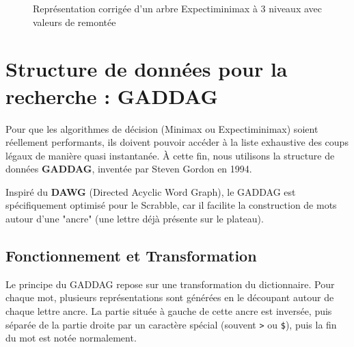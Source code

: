 \documentclass[a4paper]{article}
\begin{document}
\begin{figure}[H]
    \caption{Représentation corrigée d'un arbre Expectiminimax à 3 niveaux avec valeurs de remontée}
    \label{fig:tree_structure}
\end{figure}



\section{Structure de données pour la recherche : GADDAG}
\hangindent=0.8mm
Pour que les algorithmes de décision (Minimax ou Expectiminimax) soient réellement performants, ils doivent pouvoir accéder à la liste exhaustive des coups légaux de manière quasi instantanée. À cette fin, nous utilisons la structure de données \textbf{GADDAG}, inventée par Steven Gordon en 1994.

\hangindent=0.8mm
Inspiré du \textbf{DAWG} (Directed Acyclic Word Graph), le GADDAG est spécifiquement optimisé pour le Scrabble, car il facilite la construction de mots autour d'une "ancre" (une lettre déjà présente sur le plateau).

\subsection{Fonctionnement et Transformation}
\hangindent=0.8mm
Le principe du GADDAG repose sur une transformation du dictionnaire. Pour chaque mot, plusieurs représentations sont générées en le découpant autour de chaque lettre ancre. La partie située à gauche de cette ancre est inversée, puis séparée de la partie droite par un caractère spécial (souvent \texttt{>} ou \texttt{\$}), puis la fin du mot est notée normalement.
\end{document}
